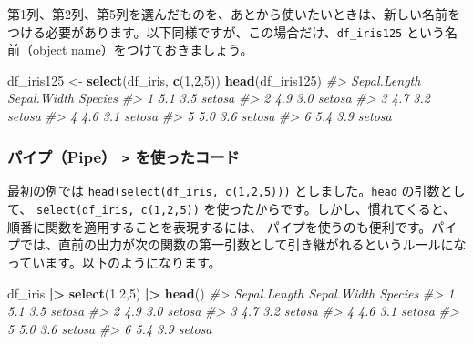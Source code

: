 \documentclass[
  xelatex, ja=standard]{bxjsbook}
\newenvironment{Shaded}{\begin{snugshade}}{\end{snugshade}}
\newcommand{\CommentTok}[1]{\textcolor[rgb]{0.56,0.35,0.01}{\textit{#1}}}
\newcommand{\DecValTok}[1]{\textcolor[rgb]{0.00,0.00,0.81}{#1}}
\newcommand{\FunctionTok}[1]{\textcolor[rgb]{0.13,0.29,0.53}{\textbf{#1}}}
\newcommand{\NormalTok}[1]{#1}
\newcommand{\OtherTok}[1]{\textcolor[rgb]{0.56,0.35,0.01}{#1}}
\newcommand{\SpecialCharTok}[1]{\textcolor[rgb]{0.81,0.36,0.00}{\textbf{#1}}}
\theoremstyle{definition}
\theoremstyle{definition}
\theoremstyle{definition}
\theoremstyle{definition}
\theoremstyle{remark}
\begin{document}
第1列、第2列、第5列を選んだものを、あとから使いたいときは、新しい名前をつける必要があります。以下同様ですが、この場合だけ、\texttt{df\_iris125} という名前（object name）をつけておきましょう。

\begin{Shaded}
\begin{Highlighting}[]
\NormalTok{df\_iris125 }\OtherTok{\textless{}{-}} \FunctionTok{select}\NormalTok{(df\_iris, }\FunctionTok{c}\NormalTok{(}\DecValTok{1}\NormalTok{,}\DecValTok{2}\NormalTok{,}\DecValTok{5}\NormalTok{))}
\FunctionTok{head}\NormalTok{(df\_iris125)}
\CommentTok{\#\textgreater{}   Sepal.Length Sepal.Width Species}
\CommentTok{\#\textgreater{} 1          5.1         3.5  setosa}
\CommentTok{\#\textgreater{} 2          4.9         3.0  setosa}
\CommentTok{\#\textgreater{} 3          4.7         3.2  setosa}
\CommentTok{\#\textgreater{} 4          4.6         3.1  setosa}
\CommentTok{\#\textgreater{} 5          5.0         3.6  setosa}
\CommentTok{\#\textgreater{} 6          5.4         3.9  setosa}
\end{Highlighting}
\end{Shaded}

\hypertarget{ux30d1ux30a4ux30d7pipe-ux3092ux4f7fux3063ux305fux30b3ux30fcux30c9}{%
\subsubsection{\texorpdfstring{パイプ（Pipe） \texttt{\textbar{}\textgreater{}} を使ったコード}{パイプ（Pipe） \textbar\textgreater{} を使ったコード}}\label{ux30d1ux30a4ux30d7pipe-ux3092ux4f7fux3063ux305fux30b3ux30fcux30c9}}

最初の例では \texttt{head(select(df\_iris,\ c(1,2,5)))} としました。\texttt{head} の引数として、 \texttt{select(df\_iris,\ c(1,2,5))} を使ったからです。しかし、慣れてくると、順番に関数を適用することを表現するには、 パイプを使うのも便利です。パイプでは、直前の出力が次の関数の第一引数として引き継がれるというルールになっています。以下のようになります。

\begin{Shaded}
\begin{Highlighting}[]
\NormalTok{df\_iris }\SpecialCharTok{|\textgreater{}} \FunctionTok{select}\NormalTok{(}\DecValTok{1}\NormalTok{,}\DecValTok{2}\NormalTok{,}\DecValTok{5}\NormalTok{) }\SpecialCharTok{|\textgreater{}} \FunctionTok{head}\NormalTok{()}
\CommentTok{\#\textgreater{}   Sepal.Length Sepal.Width Species}
\CommentTok{\#\textgreater{} 1          5.1         3.5  setosa}
\CommentTok{\#\textgreater{} 2          4.9         3.0  setosa}
\CommentTok{\#\textgreater{} 3          4.7         3.2  setosa}
\CommentTok{\#\textgreater{} 4          4.6         3.1  setosa}
\CommentTok{\#\textgreater{} 5          5.0         3.6  setosa}
\CommentTok{\#\textgreater{} 6          5.4         3.9  setosa}
\end{Highlighting}
\end{Shaded}
\end{document}
